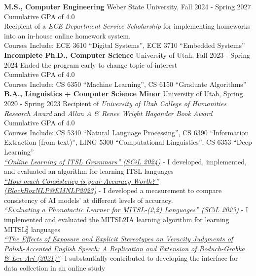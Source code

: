 \documentclass[a4paper,10pt]{article}
\newcommand{\resumeSection}[1]{\vspace{2pt}\noindent{\Large \textbf{#1}}\vspace{1pt}\newline}
\newcommand{\resumeSubsection}[2]{\noindent\textbf{#1} \hfill #2\newline}
\begin{document}
\resumeSection{Education}
    \resumeSubsection{M.S., Computer Engineering}{Weber State University, Fall 2024 - Spring 2027}
        Cumulative GPA of 4.0 \\
        Recipient of a \textit{ECE Department Service Scholarship} for implementing homeworks into an in-house online homework system. \\
        Courses Include: ECE 3610 ``Digital Systems'', ECE 3710 ``Embedded Systems'' \\
    \resumeSubsection{Incomplete Ph.D., Computer Science}{University of Utah, Fall 2023 - Spring 2024}
        Ended the program early to change topic of interest \\
        Cumulative GPA of 4.0 \\
        Courses Include: CS 6350 ``Machine Learning'', CS 6150 ``Graduate Algorithms'' \\
    \resumeSubsection{B.A., Linguistics + Computer Science Minor}{University of Utah, Spring 2020 - Spring 2023}
        Recipient of \textit{University of Utah College of Humanities Research Award} and \textit{Allan A \& Renee Wright Hagander Book Award} \\
        Cumulative GPA of 4.0 \\
        Courses Include: CS 5340 ``Natural Language Processing'', CS 6390 ``Information Extraction (from text)'', LING 5300 ``Computational Linguistics'', CS 6353 ``Deep Learning'' \\

\resumeSection{Academic Publications}
    \textit{{\href{https://aclanthology.org/2024.scil-1.23/}{``Online Learning of ITSL Grammars'' (SCiL 2024)}}}
        - I developed, implemented, and evaluated an algorithm for learning ITSL languages\\
    \textit{{\href{https://aclanthology.org/2023.blackboxnlp-1.19/}{``How much Consistency is your Accuracy Worth?'' (BlackBoxNLP@EMNLP2023)}} }
        - I developed a measurement to compare consistency of AI models' at different levels of accuracy. \\
    \textit{\href{https://scholarworks.umass.edu/cgi/viewcontent.cgi?article=1268\&context=scil}{``Evaluating a Phonotactic Learner for MITSL-(2,2) Languages'' (SCiL 2023)}} 
        - I implemented and evaluated the {MITSL2IA learning algorithm} for learning MITSL$_2^2$ languages\\
    \textit{{\href{{https://www.cambridge.org/core/journals/studies-in-second-language-acquisition/article/effects-of-exposure-and-explicit-stereotypes-on-veracity-judgments-of-polishaccented-english-speech-a-preregistered-close-replication-and-extension-of-boduchgrabka-levari-2021/EF03B7A762B1442206B537F0AD4447A4}}{``The Effects of Exposure and Explicit Stereotypes on Veracity Judgments of Polish-Accented English Speech: A Replication and Extension of Boduch-Grabka \& Lev-Ari (2021)''}}} 
        -I substantially contributed to developing the interface for data collection in an online study\\
\end{document}
